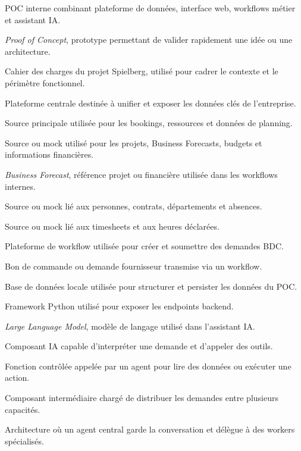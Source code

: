 \documentclass[a4paper,11pt,english,openany]{book}
\begin{document}
\begin{description}[leftmargin=3.4cm,style=nextline,itemsep=0.28em,parsep=0pt,topsep=0.3em]
    \item[Spielberg] POC interne combinant plateforme de données, interface web, workflows métier et assistant IA.
    \item[POC] \textit{Proof of Concept}, prototype permettant de valider rapidement une idée ou une architecture.
    \item[CDC] Cahier des charges du projet Spielberg, utilisé pour cadrer le contexte et le périmètre fonctionnel.
    \item[Core Data Platform] Plateforme centrale destinée à unifier et exposer les données clés de l'entreprise.
    \item[Teamium] Source principale utilisée pour les bookings, ressources et données de planning.
    \item[Altair] Source ou mock utilisé pour les projets, Business Forecasts, budgets et informations financières.
    \item[BF] \textit{Business Forecast}, référence projet ou financière utilisée dans les workflows internes.
    \item[OneClick] Source ou mock lié aux personnes, contrats, départements et absences.
    \item[rOar] Source ou mock lié aux timesheets et aux heures déclarées.
    \item[Kissflow] Plateforme de workflow utilisée pour créer et soumettre des demandes BDC.
    \item[BDC] Bon de commande ou demande fournisseur transmise via un workflow.
    \item[SQLite] Base de données locale utilisée pour structurer et persister les données du POC.
    \item[FastAPI] Framework Python utilisé pour exposer les endpoints backend.
    \item[LLM] \textit{Large Language Model}, modèle de langage utilisé dans l'assistant IA.
    \item[Agent] Composant IA capable d'interpréter une demande et d'appeler des outils.
    \item[Tool] Fonction contrôlée appelée par un agent pour lire des données ou exécuter une action.
    \item[Orchestrator] Composant intermédiaire chargé de distribuer les demandes entre plusieurs capacités.
    \item[Supervisor] Architecture où un agent central garde la conversation et délègue à des workers spécialisés.

\end{description}
\end{document}
